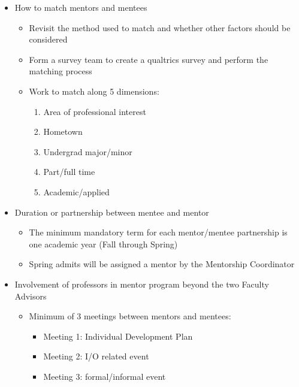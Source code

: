 \documentclass[
]{book}
\providecommand{\tightlist}{%
  \setlength{\itemsep}{0pt}\setlength{\parskip}{0pt}}
\begin{document}
\begin{itemize}
\tightlist
\item
  How to match mentors and mentees

  \begin{itemize}
  \tightlist
  \item
    Revisit the method used to match and whether other factors should be considered
  \item
    Form a survey team to create a qualtrics survey and perform the matching process
  \item
    Work to match along 5 dimensions:

    \begin{enumerate}
    \def\labelenumi{\arabic{enumi}.}
    \tightlist
    \item
      Area of professional interest
    \item
      Hometown
    \item
      Undergrad major/minor
    \item
      Part/full time
    \item
      Academic/applied
    \end{enumerate}
  \end{itemize}
\item
  Duration or partnership between mentee and mentor

  \begin{itemize}
  \tightlist
  \item
    The minimum mandatory term for each mentor/mentee partnership is one academic year (Fall through Spring)
  \item
    Spring admits will be assigned a mentor by the Mentorship Coordinator
  \end{itemize}
\item
  Involvement of professors in mentor program beyond the two Faculty Advisors

  \begin{itemize}
  \tightlist
  \item
    Minimum of 3 meetings between mentors and mentees:

    \begin{itemize}
    \tightlist
    \item
      Meeting 1: Individual Development Plan
    \item
      Meeting 2: I/O related event
    \item
      Meeting 3: formal/informal event
    \end{itemize}
  \end{itemize}
\end{itemize}
\end{document}
